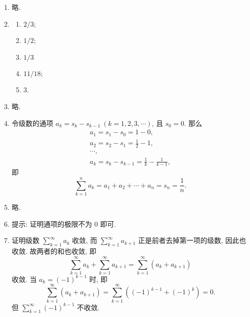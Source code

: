 % 
\begin{enumerate}
    \item %
        略.
    \item %
        \begin{multicols}{5}
            \begin{enumerate}[(1)]
                \item %
                    $2/3$;
                \item %
                    $1/2$;
                \item %
                    $1/3$
                \item %
                    $11/18$;
                \item %
                    $3$.
            \end{enumerate}
        \end{multicols}
    \item %
        略.
    \item %
        令级数的通项 $a_k = s_{k} - s_{k-1}\ (k = 1, 2, 3, \cdots)$, 且 $s_0 = 0$. 那么
        \begin{gather*}
            a_1 = s_1 - s_0 = 1 - 0, \\
            a_2 = s_2 - s_1 = \frac12 - 1, \\
            \cdots, \\
            a_k = s_k - s_{k-1} = \frac{1}{k} - \frac{1}{k - 1},
        \end{gather*}
        即
        \[
            \sum_{k=1}^n a_k = a_1 + a_2 + \cdots + a_n = s_n = \frac{1}{n}.    
        \]
    \item %
        略.
    \item %
        提示: 证明通项的极限不为 $0$ 即可.
    \item %
        {\heiti 证明}\quad 级数 $\sum\limits_{k=1}^\infty a_k$ 收敛, 而 $\sum\limits_{k=1}^\infty a_{k+1}$ 正是前者去掉第一项的级数, 因此也收敛.
        故两者的和也收敛, 即
        \[
            \sum_{k=1}^\infty a_k + \sum_{k=1}^\infty a_{k+1} = \sum_{k=1}^\infty(a_k + a_{k+1})    
        \]
        收敛. 当 $a_k = (-1)^{k-1}$ 时, 即
        \[
            \sum_{k=1}^\infty(a_k + a_{k+1}) = \sum_{k=1}^\infty((-1)^{k-1} + (-1)^{k}) = 0.    
        \]
        但 $\sum\limits_{k=1}^\infty (-1)^{k-1}$ 不收敛.


\end{enumerate}
